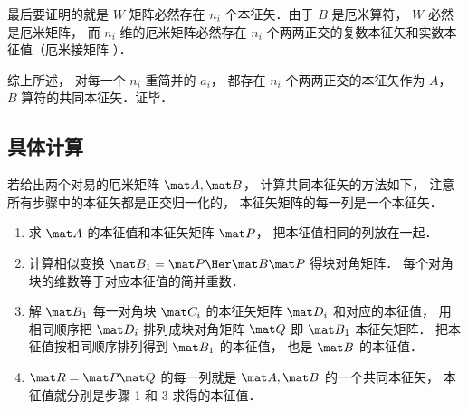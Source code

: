 最后要证明的就是 $W$ 矩阵必然存在 $n_i$ 个本征矢．由于 $B$ 是厄米算符，  $W$ 必然是厄米矩阵， 而 $n_i$ 维的厄米矩阵必然存在 $n_i$ 个两两正交的复数本征矢和实数本征值（厄米接矩阵%
）．

综上所述， 对每一个 $n_i$ 重简并的 $a_i$，  都存在 $n_i$ 个两两正交的本征矢作为 $A$，  $B$ 算符的共同本征矢．证毕．

\subsection{具体计算}

若给出两个对易的厄米矩阵 $\mat A, \mat B$， 计算共同本征矢的方法如下， 注意所有步骤中的本征矢都是正交归一化的， 本征矢矩阵的每一列是一个本征矢．
\begin{enumerate}
\item 求 $\mat A$ 的本征值和本征矢矩阵 $\mat P$， 把本征值相同的列放在一起．
\item 计算相似变换 $\mat B_1 = \mat P\Her \mat B\mat P$ 得块对角矩阵． 每个对角块的维数等于对应本征值的简并重数．
\item 解 $\mat B_1$ 每一对角块 $\mat C_i$ 的本征矢矩阵 $\mat D_i$ 和对应的本征值， 用相同顺序把 $\mat D_i$ 排列成块对角矩阵 $\mat Q$ 即 $\mat B_1$ 本征矢矩阵． 把本征值按相同顺序排列得到 $\mat B_1$ 的本征值， 也是 $\mat B$ 的本征值．
\item $\mat R = \mat P\mat Q$ 的每一列就是 $\mat A, \mat B$ 的一个共同本征矢， 本征值就分别是步骤 1 和 3 求得的本征值．
\end{enumerate}

